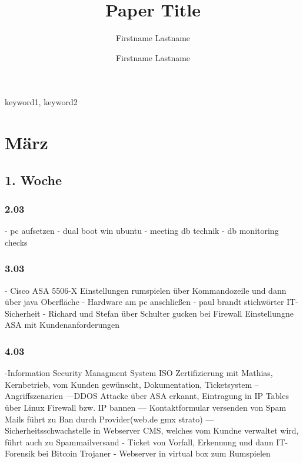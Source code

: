 \documentclass[english,runningheads,a4paper]{llncs}[2018/03/10]
\begin{document}
\title{Paper Title}

\author{Firstname Lastname \and Firstname Lastname}

%
%

\maketitle

\begin{abstract}
  \lipsum[1]
\end{abstract}

\begin{keywords}
  keyword1, keyword2
\end{keywords}

\section{März}
\subsection{1. Woche}
\subsubsection{2.03}
- pc aufsetzen
- dual boot win ubuntu
- meeting db technik
- db monitoring checks

\subsubsection{3.03}
- Cisco ASA 5506-X Einstellungen rumspielen über Kommandozeile und dann über java Oberfläche
- Hardware am pc anschließen
- paul brandt stichwörter IT-Sicherheit
- Richard und Stefan über Schulter gucken bei Firewall Einstellungne ASA mit Kundenanforderungen

\subsubsection{4.03}
-Information Security Managment System ISO Zertifizierung mit Mathias, Kernbetrieb, vom Kunden gewünscht, Dokumentation, Ticketsystem
-- Angriffszenarien 
---DDOS Attacke über ASA erkannt, Eintragung in IP Tables über Linux Firewall bzw. IP bannen
--- Kontaktformular versenden von Spam Mails führt zu Ban durch Provider(web.de gmx strato)
--- Sicherheitsschwachstelle in Webserver CMS, welches vom Kundne verwaltet wird, führt auch zu Spammailversand
- Ticket von Vorfall, Erkennung und dann IT-Forensik bei Bitcoin Trojaner
- Webserver in virtual box zum Rumspielen
\end{document}
